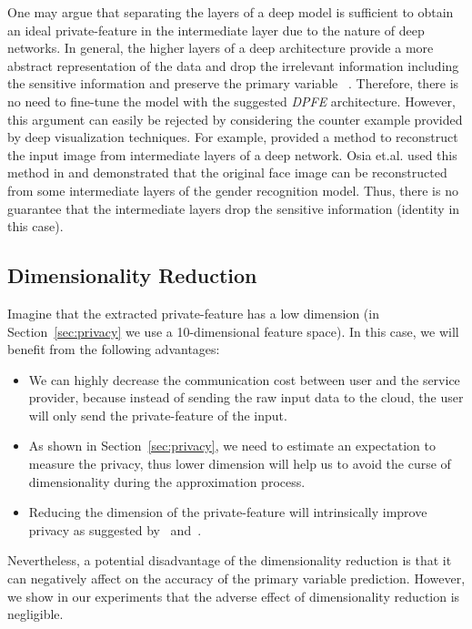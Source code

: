\documentclass[10pt,journal,compsoc]{IEEEtran}
\begin{document}
One may argue that separating the layers of a deep model is sufficient to obtain an ideal private-feature in the intermediate layer due to the nature of deep networks. In general, the higher layers of a deep architecture provide a more abstract representation of the data and drop the irrelevant information including the sensitive information \cite{shwartz2017} and preserve the primary variable ~\cite{yosinski2014}. Therefore, there is no need to fine-tune the model with the suggested \emph{DPFE} architecture. However, this argument can easily be rejected by considering the counter example provided by deep visualization techniques. For example, \cite{dosovitskiy2016} provided a method to reconstruct the input image from intermediate layers of a deep network. Osia et.al. used this method in \cite{osia2017_2} and demonstrated that the original face image can be reconstructed from some intermediate layers of the gender recognition model. Thus, there is no guarantee that the intermediate layers drop the sensitive information (identity in this case).

\subsection{Dimensionality Reduction}

Imagine that the extracted private-feature has a low dimension (in Section~\ref{sec:privacy} we use a 10-dimensional feature space). In this case, we will benefit from the following advantages: 
\begin{itemize}
	\item We can highly decrease the communication cost between user and the service provider, because instead of sending the raw input data to the cloud, the user will only send the private-feature of the input.
	\item As shown in Section~\ref{sec:privacy}, we need to estimate an expectation to measure the privacy, thus lower dimension will help us to avoid the curse of dimensionality during the approximation process.
	\item Reducing the dimension of the private-feature will intrinsically improve privacy as suggested by~\cite{osia2017_2} and~\cite{malekzadeh2017}.
\end{itemize}
Nevertheless, a potential disadvantage of the dimensionality reduction is that it can negatively affect on the accuracy of the primary variable prediction. However, we show in our experiments that the adverse effect of dimensionality reduction is negligible.
\end{document}
